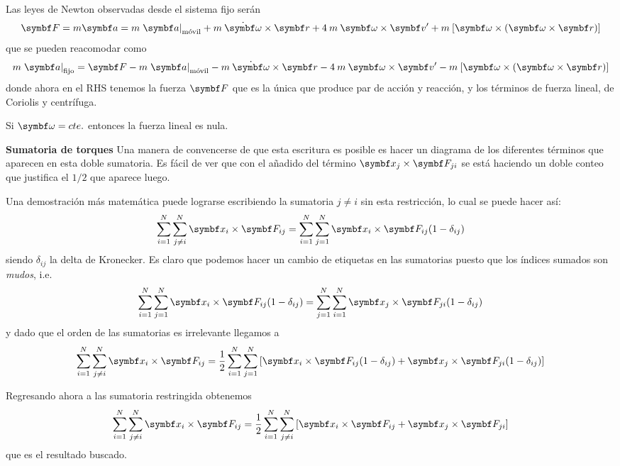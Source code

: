 \documentclass[10pt,oneside]{CBFT_book}
\begin{document}
Las leyes de Newton observadas desde el sistema fijo serán 
\[
	\vb{F} = m\vb{a} = m \left. \vb{a}\right|_\text{móvil} + m \: \dot{ \vb{\omega} } \times \vb{r} + 4 \: m \: 
	\vb{\omega}\times\vb{v'} + m \: [  \vb{\omega} \times (\vb{\omega}\times\vb{r} )]
\]
que se pueden reacomodar como  
\[
	m \left. \vb{a}\right|_\text{fijo} = 
	\vb{F} - m \left. \vb{a}\right|_\text{móvil} - m \: \dot{\vb{\omega}} \times \vb{r} - 4 \: m \: \vb{\omega}\times\vb{v'} -
	m \: [\vb{\omega} \times(\vb{\omega}\times\vb{r})]
\]
donde ahora en el RHS tenemos la fuerza $\vb{F}$ que es la única que produce par de acción y reacción, y los términos de 
fuerza lineal, de Coriolis y centrífuga.

Si $\vb{\omega} = cte.$ entonces la fuerza lineal es nula.


\begin{notasfinales}

\label{nota_suma_ineqj}
\item{ \bf Sumatoria de torques}
Una manera de convencerse de que esta escritura es posible es hacer un diagrama de los diferentes términos que
aparecen en esta doble sumatoria. Es fácil de ver que con el añadido del término $\vb{x}_j \times \vb{F}_{ji} $ se está 
haciendo un doble conteo que justifica el $1/2$ que aparece luego.

Una demostración más matemática puede lograrse escribiendo la sumatoria $ j\neq i $ sin esta restricción, lo cual se 
puede hacer así:
\[
	\Sum{i=1}{N} \Sum{j\neq i}{N}  \vb{x}_i \times \vb{F}_{ij} = 
	\Sum{i=1}{N} \Sum{j=1}{N}  \vb{x}_i \times \vb{F}_{ij} ( 1 - \delta_{ij} )
\]
siendo $ \delta_{ij} $ la delta de Kronecker. Es claro que podemos hacer un cambio de etiquetas en las sumatorias 
puesto que los índices sumados son {\it mudos}, i.e.
\[
	\Sum{i=1}{N} \Sum{j=1}{N}  \vb{x}_i \times \vb{F}_{ij} ( 1 - \delta_{ij} ) = 
	\Sum{j=1}{N} \Sum{i=1}{N}  \vb{x}_j \times \vb{F}_{ji} ( 1 - \delta_{ij} )
\]
y dado que el orden de las sumatorias es irrelevante llegamos a
\[
	\Sum{i=1}{N} \Sum{j\neq i}{N}  \vb{x}_i \times \vb{F}_{ij} = \frac{1}{2}
	\Sum{i=1}{N} \Sum{j=1}{N} \left[ \vb{x}_i \times \vb{F}_{ij} ( 1 - \delta_{ij} ) +
	\vb{x}_j \times \vb{F}_{ji} ( 1 - \delta_{ij} )
	\right] 
\]

Regresando ahora a las sumatoria restringida obtenemos 
\[
	\Sum{i=1}{N} \Sum{j\neq i}{N}  \vb{x}_i \times \vb{F}_{ij} = \frac{1}{2}
	\Sum{i=1}{N} \Sum{j \neq i }{N} \left[ \vb{x}_i \times \vb{F}_{ij} + \vb{x}_j \times \vb{F}_{ji} \right] 
\]
que es el resultado buscado.


\end{notasfinales}



\end{document}
